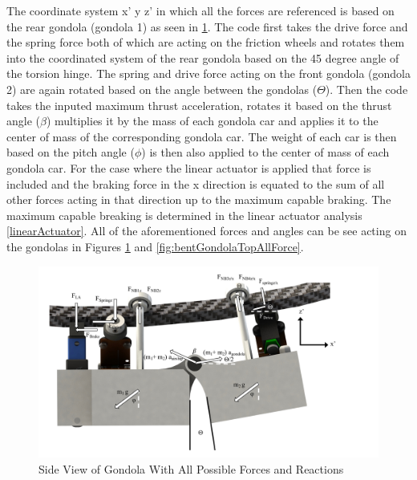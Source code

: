 \documentclass[../main.tex]{subfiles}
\begin{document}
The coordinate system x' y z' in which all the forces are referenced is based on the rear gondola (gondola 1) as seen in \ref{fig:bentGondolaSideAllForce}. The code first takes the drive force and the spring force both of which are acting on the friction wheels and rotates them into the coordinated system of the rear gondola based on the 45 degree angle of the torsion hinge. The spring and drive force acting on the front gondola (gondola 2) are again rotated based on the angle between the gondolas ($\Theta$). Then the code takes the inputed maximum thrust acceleration, rotates it based on the thrust angle ($\beta$) multiplies it by the mass of each gondola car and applies it to the center of mass of the corresponding gondola car. The weight of each car is then based on the pitch angle ($\phi$) is then also applied to the center of mass of each gondola car. For the case where the linear actuator is applied that force is included and the braking force in the x direction is equated to the sum of all other forces acting in that direction up to the maximum capable braking. The maximum capable breaking is determined in the linear actuator analysis \ref{linearActuator}. All of the aforementioned forces and angles can be see acting on the gondolas in Figures \ref{fig:bentGondolaSideAllForce} and \ref{fig:bentGondolaTopAllForce}. \\
\begin{figure}[H]
	\centering
	\includegraphics[width=1.1\linewidth]{img/gondola/bentGondolaSideAllForces.pdf}
	\caption{Side View of Gondola With All Possible Forces and Reactions}
	\label{fig:bentGondolaSideAllForce}
\end{figure}
\end{document}

